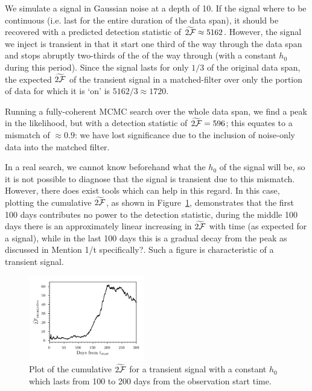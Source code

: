 \documentclass[aps, prd, twocolumn, superscriptaddress, floatfix, showpacs, nofootinbib, longbibliography]{revtex4-1}
\newcommand{\addtext}[1]{\textcolor{green!50!black}{#1}}
\newcommand{\meta}[1]{\addtext{#1}}
\begin{document}
We simulate a signal in Gaussian noise at a depth of 10. If the signal where to
be continuous (i.e. last for the entire duration of the data span), it should
be recovered with a predicted detection statistic of
$\widetilde{2{\mathcal{F}}}\approx5162$. However, the signal we inject is transient in
that it start one third of the way through the data span and stops abruptly
two-thirds of the of the way through (with a constant $h_0$ during this
period). Since the signal lasts for only $1/3$ of the original data span, the
expected $\widetilde{2{\mathcal{F}}}$ of the transient signal in a matched-filter over only
the portion of data for which it is `on' is $5162/3\approx1720$.

Running a fully-coherent MCMC search over the whole data span, we find a peak
in the likelihood, but with a detection statistic of $\widetilde{2{\mathcal{F}}}=596$;
this equates to a mismatch of $\approx0.9$: we have lost significance due
to the inclusion of noise-only data into the matched filter.

In a real search, we cannot know beforehand what the $h_0$ of the signal will
be, so it is not possible to diagnose that the signal is transient due to this
mismatch. However, there does exist tools which can help in this regard. In
this case, plotting the cumulative $\widetilde{2{\mathcal{F}}}$, as shown in
Figure~\ref{fig_transient_cumulative_twoF}, demonstrates that the first 100
days contributes no power to the detection statistic, during the middle 100
days there is an approximately linear increasing in $\widetilde{2{\mathcal{F}}}$ with time
(as expected for a signal), while in the last 100 days this is a gradual decay
from the peak as discussed in \citet{prix2011} \meta{Mention 1/t specifically?}. Such a figure is characteristic of a transient signal.
\begin{figure}[htb]
\centering
\includegraphics[width=0.45\textwidth]{transient_search_initial_stage_twoFcumulative}
\caption{Plot of the cumulative $\widetilde{2{\mathcal{F}}}$ for a transient signal with a
constant $h_0$ which lasts from 100 to 200 days from the observation start
time.}
\label{fig_transient_cumulative_twoF}
\end{figure}
\end{document}
